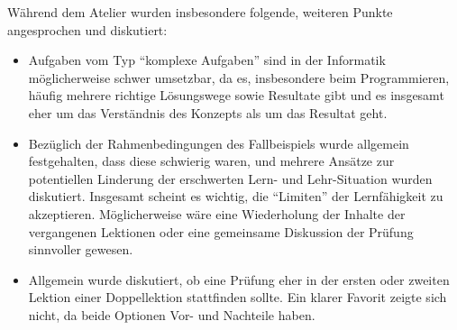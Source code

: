 \begin{myExBox}[title=Persönliche Beantwortung der Fragestellungen]
\begin{myExBox}[title=Inputs vom Atelier]
Während dem Atelier wurden insbesondere folgende, weiteren Punkte angesprochen und diskutiert:
\begin{itemize}
\item Aufgaben vom Typ ``komplexe Aufgaben'' sind in der Informatik möglicherweise schwer umsetzbar, da es, insbesondere beim Programmieren, häufig mehrere richtige Lösungswege sowie Resultate gibt und es insgesamt eher um das Verständnis des Konzepts als um das Resultat geht.
\item Bezüglich der Rahmenbedingungen des Fallbeispiels wurde allgemein festgehalten, dass diese schwierig waren, und mehrere Ansätze zur potentiellen Linderung der erschwerten Lern- und Lehr-Situation wurden diskutiert. Insgesamt scheint es wichtig, die ``Limiten'' der Lernfähigkeit zu akzeptieren. Möglicherweise wäre eine Wiederholung der Inhalte der vergangenen Lektionen oder eine gemeinsame Diskussion der Prüfung sinnvoller gewesen.
\item Allgemein wurde diskutiert, ob eine Prüfung eher in der ersten oder zweiten Lektion einer Doppellektion stattfinden sollte. Ein klarer Favorit zeigte sich nicht, da beide Optionen Vor- und Nachteile haben.
\end{itemize}
\end{myExBox}

\end{myExBox}